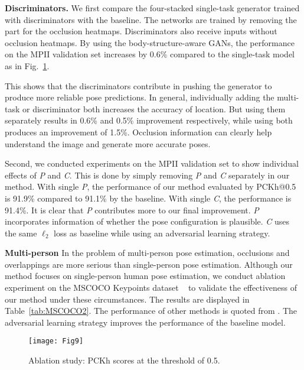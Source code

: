 \documentclass[10pt,journal,compsoc]{IEEEtran}
\begin{document}
\noindent\textbf{Discriminators.}
We first compare the four-stacked single-task generator trained with discriminators with the baseline.
The networks are trained by removing the part for the occlusion heatmaps.
Discriminators also receive inputs without occlusion heatmaps.
By using the body-structure-aware GANs, the performance on the MPII validation set increases by 0.6\% compared to the single-task model as in Fig.~\ref{fig:9}.

This shows that the discriminators  contribute in pushing the generator to produce more reliable pose predictions.
In general, individually adding the multi-task or discriminator both increases the accuracy of location.
But using them separately results in 0.6\% and 0.5\% improvement respectively, while using both produces an improvement of 1.5\%.
%
Occlusion information can clearly help  understand the image and generate  more accurate poses.
%



Second, we conducted experiments on the MPII validation set to show individual effects of \textit{P} and {\it C}. This is done by simply removing \textit{P} and \textit{C} separately in our method. With single \textit{P}, the performance of our method  evaluated by PCKh@0.5  is 91.9\% compared to 91.1\% by the baseline. With single \textit{C}, the performance is 91.4\%. It is clear that \textit{P} contributes more to our final improvement. \textit{P} incorporates information of whether the pose configuration is plausible. \textit{C} uses the same $\ell_2$ loss as baseline while using an adversarial learning strategy.



\noindent\textbf{Multi-person}
In the problem of multi-person pose estimation, occlusions and overlappings are more serious than single-person pose estimation.
Although our method focuses on single-person human pose estimation, we conduct ablation experiment on the MSCOCO  Keypoints dataset ~\cite{lin2014microsoft} to validate the effectiveness of our method under these circumstances.
The results are displayed in Table~\ref{tab:MSCOCO2}.
The performance of other methods is quoted from \cite{fang2017rmpe}.
The adversarial learning strategy  improves the performance of the baseline model.



\begin{figure}[t!]
\centering
\texttt{[image: Fig9]}
%
\caption{Ablation study: PCKh scores at the threshold of 0.5.}
\label{fig:9}
\end{figure}
\end{document}
